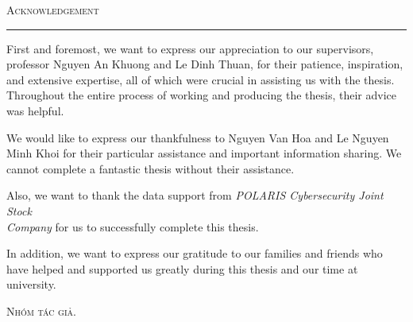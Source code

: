 \thispagestyle{empty}
\vspace*{3cm}
\noindent\Huge\textsc{Acknowledgement}\\
\normalsize
\noindent\rule[2pt]{\textwidth}{0.8pt}
\hspace*{5cm}
 
First and foremost, we want to express our appreciation to our supervisors, professor Nguyen An Khuong and Le Dinh Thuan, for their patience, inspiration, and extensive expertise, all of which were crucial in assisting us with the thesis. Throughout the entire process of working and producing the thesis, their advice was helpful.

We would like to express our thankfulness to Nguyen Van Hoa and Le Nguyen Minh Khoi for their particular assistance and important information sharing. We cannot complete a fantastic thesis without their assistance.

Also, we want to thank the data support from \textit{POLARIS Cybersecurity Joint Stock \\Company} for us to successfully complete this thesis.

In addition, we want to express our gratitude to our families and friends who have helped and supported us greatly during this thesis and our time at university.
	
	\hfill \textsc{Nhóm tác giả.}
	
\cleardoublepage
